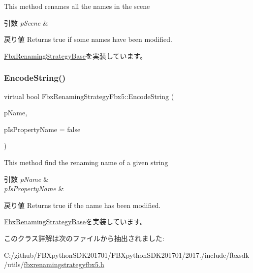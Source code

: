 This method renames all the names in the scene 
\begin{DoxyParams}{引数}
{\em p\+Scene} & \\
\hline
\end{DoxyParams}
\begin{DoxyReturn}{戻り値}
Returns true if some names have been modified. 
\end{DoxyReturn}


\hyperlink{class_fbx_renaming_strategy_base_a7449fa6c649949d6d5e3c4b7190d6b25}{Fbx\+Renaming\+Strategy\+Base}を実装しています。

\mbox{\label{class_fbx_renaming_strategy_fbx5_adcd74ccce2269d962b5bd8e8600c472c}} 
\subsubsection{\texorpdfstring{Encode\+String()}{EncodeString()}}
{\footnotesize\ttfamily virtual bool Fbx\+Renaming\+Strategy\+Fbx5\+::\+Encode\+String (\begin{DoxyParamCaption}\item[{\hyperlink{class_fbx_name_handler}{Fbx\+Name\+Handler} \&}]{p\+Name,  }\item[{bool}]{p\+Is\+Property\+Name = {\ttfamily false} }\end{DoxyParamCaption})\hspace{0.3cm}{\ttfamily [virtual]}}

This method find the renaming name of a given string 
\begin{DoxyParams}{引数}
{\em p\+Name} & \\
\hline
{\em p\+Is\+Property\+Name} & \\
\hline
\end{DoxyParams}
\begin{DoxyReturn}{戻り値}
Returns true if the name has been modified. 
\end{DoxyReturn}


\hyperlink{class_fbx_renaming_strategy_base_aa762726a9d92a328ec720f2b8135db09}{Fbx\+Renaming\+Strategy\+Base}を実装しています。



このクラス詳解は次のファイルから抽出されました\+:\begin{DoxyCompactItemize}
\item 
C\+:/github/\+F\+B\+Xpython\+S\+D\+K201701/\+F\+B\+Xpython\+S\+D\+K201701/2017./include/fbxsdk/utils/\hyperlink{fbxrenamingstrategyfbx5_8h}{fbxrenamingstrategyfbx5.\+h}\end{DoxyCompactItemize}
